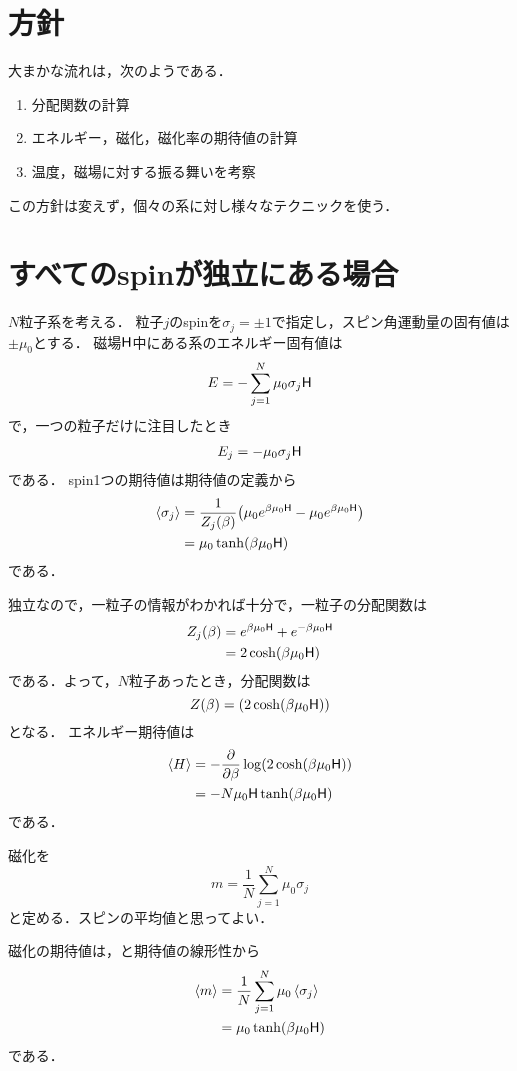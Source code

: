 	\section{方針}
	大まかな流れは，次のようである．
	\begin{enumerate}
			\item 分配関数の計算
			\item エネルギー，磁化，磁化率の期待値の計算
			\item 温度，磁場に対する振る舞いを考察
	\end{enumerate}
	この方針は変えず，個々の系に対し様々なテクニックを使う．

	\section{すべてのspinが独立にある場合}
	$N$粒子系を考える．
	粒子$j$のspinを$\sigma_j = \pm 1$で指定し，スピン角運動量の固有値は$\pm\mu_0$とする．
	磁場$\mathsf{H}$中にある系のエネルギー固有値は
	\begin{equation}
			E = -\sum_{j=1}^{N}\mu_0\sigma_j\mathsf{H}
	\end{equation}
	で，一つの粒子だけに注目したとき
	\begin{align}
			E_j = -\mu_0\sigma_j\mathsf{H}
	\end{align}
	である．
	spin1つの期待値は期待値の定義から
	\begin{align}
			\expval{\sigma_j} &= \frac{1}{Z_j(\beta)}\qty(\mu_0e^{\beta\mu_0\mathsf{H}} - \mu_0e^{\beta\mu_0\mathsf{H}})\\
							  &= \mu_0\tanh(\beta\mu_0\mathsf{H})\label{eq:onespin}
	\end{align}
	である．

	独立なので，一粒子の情報がわかれば十分で，一粒子の分配関数は
	\begin{align}
			Z_j(\beta) &= e^{\beta\mu_0\mathsf{H}} + e^{-\beta\mu_0\mathsf{H}}\\
				&= 2\cosh(\beta\mu_0\mathsf{H})
	\end{align}
	である．よって，$N$粒子あったとき，分配関数は
	\begin{equation}
			Z(\beta) = \qty(2\cosh(\beta\mu_0\mathsf{H}))
	\end{equation}
	となる．
	エネルギー期待値は
	\begin{align}
			\langle H\rangle &= -\pdv{}{\beta}\log(2\cosh(\beta\mu_0\mathsf{H}))\\
							 &= -N\mu_0\mathsf{H}\tanh(\beta\mu_0\mathsf{H})
	\end{align}
	である．

	\begin{defn}[磁化]
			磁化を
			\begin{equation}
					m = \frac{1}{N}\sum_{j = 1}^{N}\mu_0\sigma_j
			\end{equation}
			と定める．スピンの平均値と思ってよい．
	\end{defn}
	磁化の期待値は，と期待値の線形性から
	\begin{align}
			\expval{m} &= \frac{1}{N}\sum_{j = 1}^{N}\mu_0\expval{\sigma_j}\\
					   &= \mu_0\tanh(\beta\mu_0\mathsf{H})
	\end{align}
	である．

